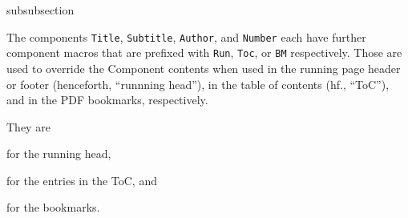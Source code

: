 \begin{heading}[label=sec:hdg:comp:overrides]{subsubsection}
\end{heading}

The components \lstinline{Title},
\lstinline{Subtitle},
\lstinline{Author}, and \lstinline{Number}
each have further component macros that are prefixed with
\lstinline{Run}, \lstinline{Toc}, or \lstinline{BM}
respectively. Those are used to override the
Component contents when used in the running page header or footer
(henceforth, “runnning head”), in the table of contents (hf.,
“ToC”), and in the PDF bookmarks, respectively.

They are
\begin{description}
\item[\string\tpRunTitle]
\item[\string\tpRunSubtitle]
\item[\string\tpRunAuthor]
\item[\string\tpRunNumber]
\end{description}
for the running head,
\begin{description}
\item[\string\tpTocTitle]
\item[\string\tpTocSubtitle]
\item[\string\tpTocAuthor]
\item[\string\tpTocNumber]
\end{description}
for the entries in the ToC, and
\begin{description}
\item[\string\tpBMTitle]
\item[\string\tpBMSubtitle]
\item[\string\tpBMAuthor]
\item[\string\tpBMNumber]
\end{description}
for the bookmarks.

